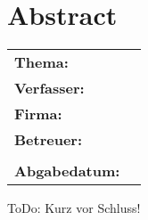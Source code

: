 \documentclass[../InterneDSLs.tex]{subfiles}
\begin{document}
\chapter*{Abstract}

\begin{center}
	\begin{tabular}{ll}
		\textbf{Thema:} 		& \topic\\
		\textbf{Verfasser:} 	& \authorName\\
		\textbf{Firma:} 		& \companyName\\
		\textbf{Betreuer:}		& \proffessor\\
								& \carer\\
		\textbf{Abgabedatum:}	& \closingdate\\
	\end{tabular}
\end{center}

\bigskip
ToDo: Kurz vor Schluss!
\newpage
\end{document}

